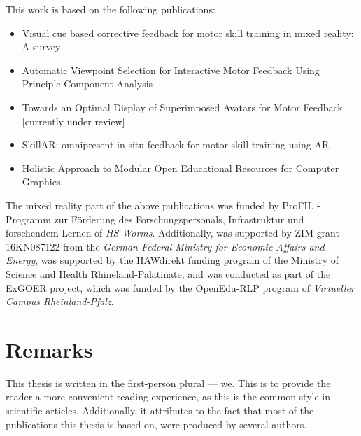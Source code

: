 This work is based on the following publications:
\begin{itemize}
	\setlength{\itemsep}{-0.3cm}
	\item Visual cue based corrective feedback for motor skill training in mixed reality: A survey \cite{diller2022vcb}
	\item Automatic Viewpoint Selection for Interactive Motor Feedback Using Principle Component Analysis \cite{diller2024automatic}
	\item Towards an Optimal Display of Superimposed Avatars for Motor Feedback [currently under review]
	\item SkillAR: omnipresent in-situ feedback for motor skill training using AR \cite{diller2024skillar}
	\item Holistic Approach to Modular Open Educational Resources for Computer Graphics \cite{diller2024holistic}
\end{itemize}


The mixed reality part of the above publications was funded by ProFIL - Programm zur Förderung des Forschungspersonals, Infrastruktur und forschendem Lernen of \emph{HS Worms}. Additionally, \cite{diller2024automatic} was supported by ZIM grant 16KN087122 from the \emph{German Federal Ministry for Economic Affairs and Energy}, \cite{diller2024skillar} was supported by the HAWdirekt funding program of the Ministry of Science and Health Rhineland-Palatinate, and \cite{diller2024holistic} was conducted as part of the ExGOER project, which was funded by the OpenEdu-RLP program of \emph{Virtueller Campus Rheinland-Pfalz}.

\section{Remarks}

This thesis is written in the first-person plural --- we. This is to provide the reader a more convenient reading experience, as this is the common style in scientific articles. Additionally, it attributes to the fact that most of the publications this thesis is based on, were produced by several authors.
